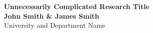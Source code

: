 \documentclass[a0,portrait]{a0poster}
\begin{document}


\begin{minipage}[b]{1.0\linewidth}
	\centering
\veryHuge \color{NavyBlue} \textbf{Unnecessarily Complicated Research Title} \color{Black}\\ %
\huge \textbf{John Smith \& James Smith}\\ %
\huge University and Department Name\\ %
\end{minipage}
%

\vspace{1cm} %

\end{document}
